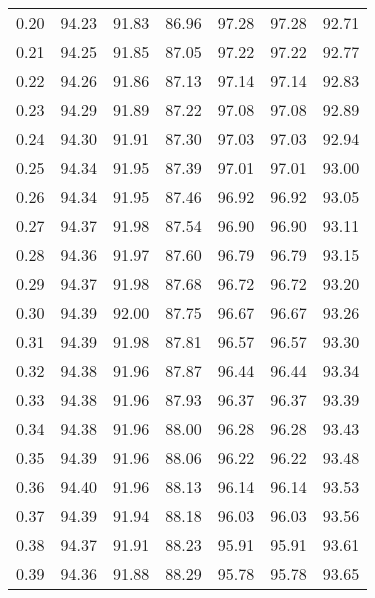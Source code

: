 \begin{tabular}{|c|c|c|c|c|c|c|}
      0.20 &     94.23 &     91.83 &      86.96 &   97.28 &      97.28 &         92.71 \\
      0.21 &     94.25 &     91.85 &      87.05 &   97.22 &      97.22 &         92.77 \\
      0.22 &     94.26 &     91.86 &      87.13 &   97.14 &      97.14 &         92.83 \\
      0.23 &     94.29 &     91.89 &      87.22 &   97.08 &      97.08 &         92.89 \\
      0.24 &     94.30 &     91.91 &      87.30 &   97.03 &      97.03 &         92.94 \\
      0.25 &     94.34 &     91.95 &      87.39 &   97.01 &      97.01 &         93.00 \\
      0.26 &     94.34 &     91.95 &      87.46 &   96.92 &      96.92 &         93.05 \\
      0.27 &     94.37 &     91.98 &      87.54 &   96.90 &      96.90 &         93.11 \\
      0.28 &     94.36 &     91.97 &      87.60 &   96.79 &      96.79 &         93.15 \\
      0.29 &     94.37 &     91.98 &      87.68 &   96.72 &      96.72 &         93.20 \\
      0.30 &     94.39 &     92.00 &      87.75 &   96.67 &      96.67 &         93.26 \\
      0.31 &     94.39 &     91.98 &      87.81 &   96.57 &      96.57 &         93.30 \\
      0.32 &     94.38 &     91.96 &      87.87 &   96.44 &      96.44 &         93.34 \\
      0.33 &     94.38 &     91.96 &      87.93 &   96.37 &      96.37 &         93.39 \\
      0.34 &     94.38 &     91.96 &      88.00 &   96.28 &      96.28 &         93.43 \\
      0.35 &     94.39 &     91.96 &      88.06 &   96.22 &      96.22 &         93.48 \\
      0.36 &     94.40 &     91.96 &      88.13 &   96.14 &      96.14 &         93.53 \\
      0.37 &     94.39 &     91.94 &      88.18 &   96.03 &      96.03 &         93.56 \\
      0.38 &     94.37 &     91.91 &      88.23 &   95.91 &      95.91 &         93.61 \\
      0.39 &     94.36 &     91.88 &      88.29 &   95.78 &      95.78 &         93.65 \\

\end{tabular}
